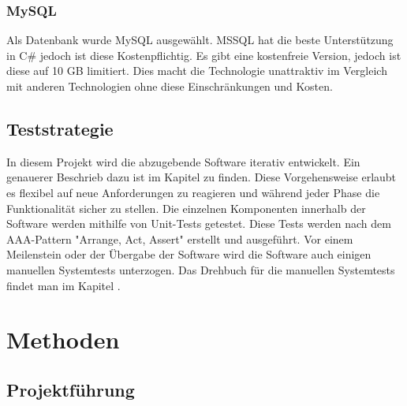 \documentclass[a4paper, table]{article}
\begin{document}

\subsubsection{MySQL}

Als Datenbank wurde MySQL ausgewählt.
MSSQL hat die beste Unterstützung in C\# jedoch ist diese Kostenpflichtig.
Es gibt eine kostenfreie Version, jedoch ist diese auf 10 GB limitiert.
Dies macht die Technologie unattraktiv im Vergleich mit anderen Technologien ohne diese Einschränkungen und Kosten.\autocite{noauthor_sql_nodate}


\subsection{Teststrategie}\label{Teststrategie}
In diesem Projekt wird die abzugebende Software iterativ entwickelt.
Ein genauerer Beschrieb dazu ist im Kapitel  zu finden.
Diese Vorgehensweise erlaubt es flexibel auf neue Anforderungen zu reagieren und
während jeder Phase die Funktionalität sicher zu stellen.
\newline
Die einzelnen Komponenten innerhalb der Software werden mithilfe von Unit-Tests getestet.
Diese Tests werden nach dem AAA-Pattern "Arrange, Act, Assert" erstellt und ausgeführt. \autocite{noauthor_arrangeactassert_nodate}
Vor einem Meilenstein oder der Übergabe der Software wird die Software auch einigen manuellen Systemtests unterzogen.
\newline
Das Drehbuch für die manuellen Systemtests findet man im Kapitel .

\newpage
\section{Methoden}

\subsection{Projektführung}
\end{document}
